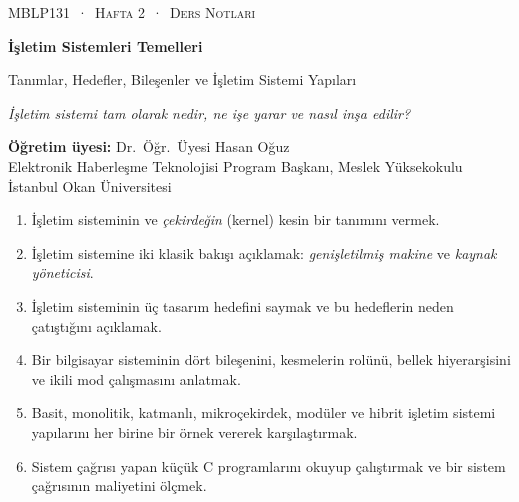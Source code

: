 \makeatletter
\lst@CCPut {}\z@
{}
\makeatother
\thispagestyle{empty}
\begin{tcolorbox}[enhanced,colback=dark,colframe=dark,arc=0pt,boxrule=0pt,
  left=18pt,right=18pt,top=20pt,bottom=20pt,coltext=white]
{\small\color{mint}\textsc{MBLP131 \,·\, Hafta 2 \,·\, Ders Notları}}\par\medskip
{\headfont\fontsize{26}{30}\selectfont\bfseries İşletim Sistemleri Temelleri}\par\medskip
{\large Tanımlar, Hedefler, Bileşenler ve İşletim Sistemi Yapıları}\par\smallskip
{\small\itshape\color{white!70} İşletim sistemi tam olarak nedir, ne işe yarar ve nasıl inşa edilir?}
\end{tcolorbox}

\vspace{0.4em}
\begin{minipage}[t]{0.70\linewidth}
\small
\textbf{Öğretim üyesi:} Dr.\ Öğr.\ Üyesi Hasan Oğuz\\
Elektronik Haberleşme Teknolojisi Program Başkanı, Meslek Yüksekokulu\\
İstanbul Okan Üniversitesi
\end{minipage}

\vspace{0.8em}
\begin{keyidea}
\begin{enumerate}[leftmargin=1.4em]
  \item İşletim sisteminin ve \emph{çekirdeğin} (kernel) kesin bir tanımını vermek.
  \item İşletim sistemine iki klasik bakışı açıklamak: \emph{genişletilmiş makine} ve \emph{kaynak yöneticisi}.
  \item İşletim sisteminin üç tasarım hedefini saymak ve bu hedeflerin neden çatıştığını açıklamak.
  \item Bir bilgisayar sisteminin dört bileşenini, kesmelerin rolünü, bellek hiyerarşisini ve ikili mod çalışmasını anlatmak.
  \item Basit, monolitik, katmanlı, mikroçekirdek, modüler ve hibrit işletim sistemi yapılarını her birine bir örnek vererek karşılaştırmak.
  \item Sistem çağrısı yapan küçük C programlarını okuyup çalıştırmak ve bir sistem çağrısının maliyetini ölçmek.
\end{enumerate}
\end{keyidea}


